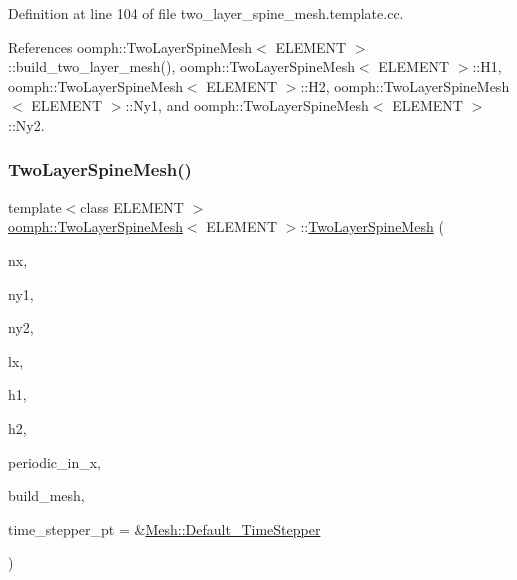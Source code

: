 Definition at line 104 of file two\+\_\+layer\+\_\+spine\+\_\+mesh.\+template.\+cc.



References oomph\+::\+Two\+Layer\+Spine\+Mesh$<$ E\+L\+E\+M\+E\+N\+T $>$\+::build\+\_\+two\+\_\+layer\+\_\+mesh(), oomph\+::\+Two\+Layer\+Spine\+Mesh$<$ E\+L\+E\+M\+E\+N\+T $>$\+::\+H1, oomph\+::\+Two\+Layer\+Spine\+Mesh$<$ E\+L\+E\+M\+E\+N\+T $>$\+::\+H2, oomph\+::\+Two\+Layer\+Spine\+Mesh$<$ E\+L\+E\+M\+E\+N\+T $>$\+::\+Ny1, and oomph\+::\+Two\+Layer\+Spine\+Mesh$<$ E\+L\+E\+M\+E\+N\+T $>$\+::\+Ny2.

\mbox{\label{classoomph_1_1TwoLayerSpineMesh_a374454978976c3873a89bedc688b983f}} 
\subsubsection{\texorpdfstring{Two\+Layer\+Spine\+Mesh()}{TwoLayerSpineMesh()}\hspace{0.1cm}{\footnotesize\ttfamily [3/3]}}
{\footnotesize\ttfamily template$<$class E\+L\+E\+M\+E\+NT $>$ \\
\hyperlink{classoomph_1_1TwoLayerSpineMesh}{oomph\+::\+Two\+Layer\+Spine\+Mesh}$<$ E\+L\+E\+M\+E\+NT $>$\+::\hyperlink{classoomph_1_1TwoLayerSpineMesh}{Two\+Layer\+Spine\+Mesh} (\begin{DoxyParamCaption}\item[{const unsigned \&}]{nx,  }\item[{const unsigned \&}]{ny1,  }\item[{const unsigned \&}]{ny2,  }\item[{const double \&}]{lx,  }\item[{const double \&}]{h1,  }\item[{const double \&}]{h2,  }\item[{const bool \&}]{periodic\+\_\+in\+\_\+x,  }\item[{const bool \&}]{build\+\_\+mesh,  }\item[{\hyperlink{classoomph_1_1TimeStepper}{Time\+Stepper} $\ast$}]{time\+\_\+stepper\+\_\+pt = {\ttfamily \&\hyperlink{classoomph_1_1Mesh_a12243d0fee2b1fcee729ee5a4777ea10}{Mesh\+::\+Default\+\_\+\+Time\+Stepper}} }\end{DoxyParamCaption})}




